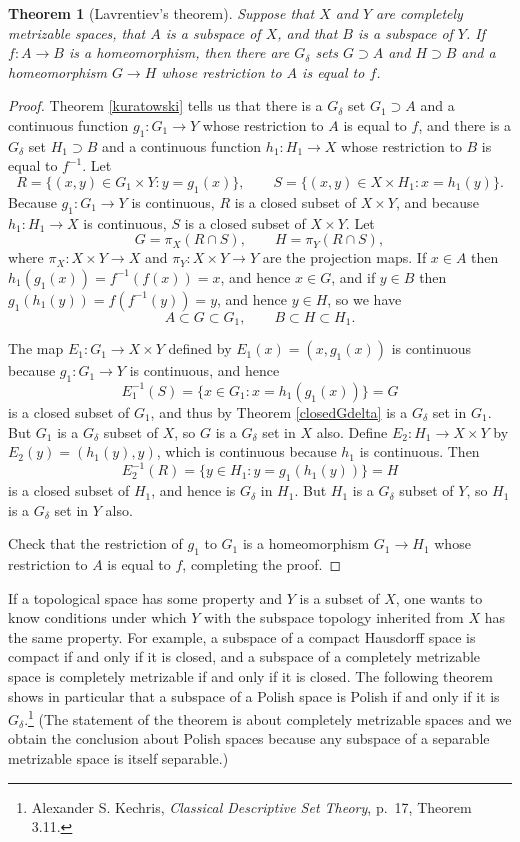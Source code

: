 \documentclass{article}
\newtheorem{theorem}{Theorem}
\theoremstyle{definition}
\begin{document}
\begin{theorem}[Lavrentiev's theorem]
Suppose that $X$ and $Y$ are completely metrizable spaces, that $A$ is a subspace of $X$, and that $B$ is a subspace of $Y$. If $f:A \to B$
is a homeomorphism, then there are $G_\delta$ sets $G \supset A$ and $H \supset B$ and a homeomorphism $G \to H$ whose restriction
to $A$ is equal to $f$.
\label{lavrentiev}
\end{theorem}
\begin{proof}
Theorem \ref{kuratowski} tells us that there is a $G_\delta$ set $G_1 \supset A$ and a continuous function
$g_1:G_1 \to Y$ whose restriction to $A$ is equal to $f$, and there is a $G_\delta$ set $H_1 \supset B$ and a continuous function
$h_1:H_1 \to X$ whose restriction to $B$ is equal to $f^{-1}$. 
Let
\[
R = \{(x,y) \in G_1 \times Y: y=g_1(x)\}, \qquad S = \{(x,y) \in X \times H_1 : x=h_1(y)\}.
\]
Because $g_1:G_1 \to Y$ is continuous,
$R$ is a closed subset of $X \times Y$, and because $h_1:H_1 \to X$ is continuous, $S$ is a closed subset of $X \times Y$.
Let
\[
G = \pi_X(R \cap S), \qquad H = \pi_Y(R \cap S),
\]
where $\pi_X:X \times Y \to X$ and $\pi_Y:X \times Y \to Y$ are the projection maps. 
If $x \in A$ then $h_1(g_1(x))=f^{-1}(f(x))=x$, and hence $x \in G$, and if $y \in B$ then $g_1(h_1(y))=f(f^{-1}(y))=y$, and hence
$y \in H$, so we have
\[
A \subset G \subset G_1, \qquad B \subset H \subset H_1.
\]

The map 
$E_1:G_1 \to X \times Y$ defined by $E_1(x) = (x,g_1(x))$ is continuous because $g_1:G_1 \to Y$ is continuous, and hence
\[
E_1^{-1}(S)=\{x \in G_1: x = h_1(g_1(x))\}=G
\] 
is a closed subset of $G_1$, and thus by Theorem \ref{closedGdelta} is a $G_\delta$ set in $G_1$. But $G_1$ is a $G_\delta$
subset of $X$, so $G$ is a $G_\delta$ set in $X$ also.
Define $E_2:H_1 \to X \times Y$ by $E_2(y)=(h_1(y),y)$, which is continuous because $h_1$
is continuous. Then
\[
E_2^{-1}(R) = \{y \in H_1: y=g_1(h_1(y))\} = H
\]
is a closed subset of $H_1$, and hence is $G_\delta$ in $H_1$.
But $H_1$ is a $G_\delta$ subset of $Y$, so $H_1$ is a $G_\delta$ set in $Y$ also.

Check  that the restriction of $g_1$ to $G_1$ is a homeomorphism $G_1 \to H_1$ whose restriction
to $A$ is equal to $f$, completing the proof.
\end{proof}


If a topological space has some property and $Y$ is a subset of $X$, one wants to know conditions under which $Y$ with the subspace
topology inherited from $X$ has the same property.
For example, a subspace of a compact Hausdorff space is compact if and only if it is closed, and a subspace of a completely metrizable space
is completely metrizable if and only if it is  closed.
The following theorem shows in particular that a subspace of a Polish space is Polish if and only if it is $G_\delta$.\footnote{Alexander S. Kechris, {\em Classical Descriptive Set Theory}, p.~17, Theorem 3.11.} (The statement
of the theorem is about completely metrizable spaces and we obtain the conclusion about Polish spaces because any subspace
of a separable metrizable space is itself separable.)
\end{document}
